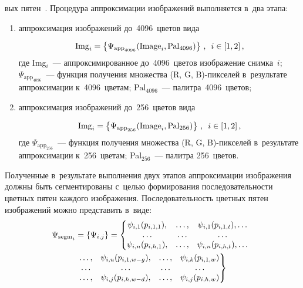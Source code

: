 \begin{multicols}{2}
\columnbreak

\noindent вых пятен~\cite{5-ar}. Процедура 
аппроксимации изображений выполняется в~два этапа:
\begin{enumerate}[(1)]
\item  аппроксимация 
изображений до~4096~цветов вида

\noindent
  \begin{equation*}
  \mathrm{Img}_i=\left\{
  \Psi_{\mathrm{app}_{4096}} (\mathrm{Image}_i ,
\mathrm{Pal}_{4096})\right\}\,,\enskip i\in [1, 2]\,,
  \end{equation*}
где Img$_i$~--- аппроксимированное до~4096~цветов изображение 
снимка~$i$;
$\Psi_{\mathrm{app}_{4096}}$~--- функция получения множества  
(R, G, B)-пик\-се\-лей в~результате аппроксимации к~4096~цветам;
$\mathrm{Pal}_{4096}$~--- палитра~4096~цветов;
\item 
аппроксимация изображений до~256~цветов вида

\noindent
\begin{equation*}
\mathrm{Img}_i=\left\{
\Psi_{\mathrm{app}_{256}}(\mathrm{Image}_i, 
\mathrm{Pal}_{256})\right\}\,,\enskip i\in [1, 2]\,,
\end{equation*}
где $\Psi_{\mathrm{app}_{256}}$~--- функция получения множества  
(R, G, B)-пик\-се\-лей в~результате аппроксимации к~256~цветам;
Pal$_{256}$~--- палитра 256~цветов.
\end{enumerate}
  
  Полученные в~результате выполнения двух этапов аппроксимации 
изображения должны быть сегментированы с~целью формирования 
последовательности цветных пятен каждого изображения. 
Последовательность цветных пятен изображений можно представить в~виде: 
  \begin{multline*}
  \hspace*{-5pt}\Psi_{\mathrm{segm}_i}=\{\Psi_{i,j}\} = \left\{
  \begin{matrix}
  \psi_{i,1}(p_{i,1,1}),&\ldots,& \psi_{i,1}(p_{i,1,t}),\ldots\\
  \ldots&\ldots&\ldots\\
  \psi_{i,n}(p_{i,h,1}),&\ldots, &\psi_{i,n}(p_{i,h,t}),\ldots\end{matrix}\right.\\
\left.\begin{matrix}
\ldots, &\psi_{i,u}(p_{i,1,w-g}),&\ldots ,& \psi_{i,k}(p_{i,1,w})\\
  \ldots&\ldots&\ldots&\ldots\\
\ldots,& \psi_{i,j}(p_{i,h,w-d}),&\ldots ,& \psi_{i,j}(p_{i,h,w})
  \end{matrix} \right\}
  \end{multline*}
  

\end{multicols}
